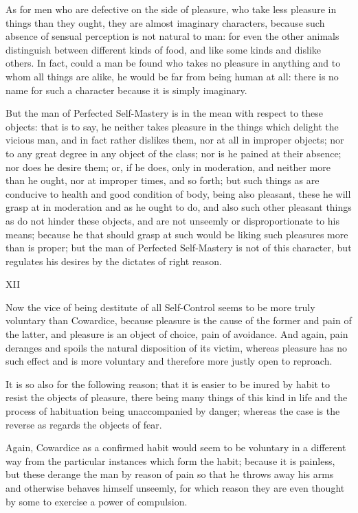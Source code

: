 As for men who are defective on the side of pleasure, who take
less pleasure in things than they ought, they are almost imaginary
characters, because such absence of sensual perception is not natural to
man: for even the other animals distinguish between different kinds of
food, and like some kinds and dislike others. In fact, could a man be
found who takes no pleasure in anything and to whom all things are
alike, he would be far from being human at all: there is no name for
such a character because it is simply imaginary.

But the man of Perfected Self-Mastery is in the mean with respect to
these objects: that is to say, he neither takes pleasure in the things
which delight the vicious man, and in fact rather dislikes them, nor at
all in improper objects; nor to any great degree in any object of the
class; nor is he pained at their absence; nor does he desire them; or,
if he does, only in moderation, and neither more than he ought, nor at
improper times, and so forth; but such things as are conducive to health
and good condition of body, being also pleasant, these he will grasp at
in moderation and as he ought to do, and also such other pleasant things
as do not hinder these objects, and are not unseemly or disproportionate
to his means; because he that should grasp at such would be liking such
pleasures more than is proper; but the man of Perfected Self-Mastery
is not of this character, but regulates his desires by the dictates of
right reason.

XII

Now the vice of being destitute of all Self-Control seems to be more
truly voluntary than Cowardice, because pleasure is the cause of the
former and pain of the latter, and pleasure is an object of choice,
pain of avoidance. And again, pain deranges and spoils the natural
disposition of its victim, whereas pleasure has no such effect and is
more voluntary and therefore more justly open to reproach.

It is so also for the following reason; that it is easier to be inured
by habit to resist the objects of pleasure, there being many things of
this kind in life and the process of habituation being unaccompanied by
danger; whereas the case is the reverse as regards the objects of fear.

Again, Cowardice as a confirmed habit would seem to be voluntary in
a different way from the particular instances which form the habit;
because it is painless, but these derange the man by reason of pain so
that he throws away his arms and otherwise behaves himself unseemly,
for which reason they are even thought by some to exercise a power of
compulsion.


